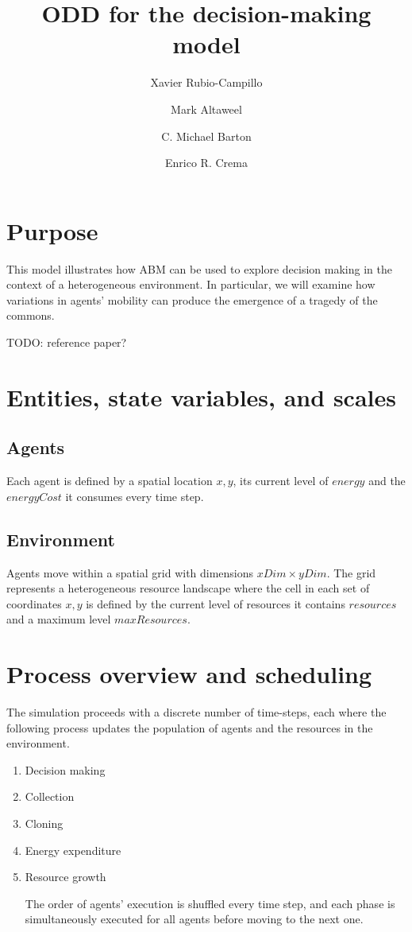 \documentclass[11pt,a4paper,twocolumn,notitlepage]{article}
\begin{document}
\title{ODD for the decision-making model}
\author{Xavier Rubio-Campillo \and Mark Altaweel \and C. Michael Barton \and Enrico R. Crema}
\maketitle

\section{Purpose}

This model illustrates how ABM can be used to explore decision making in the context of a heterogeneous environment. In particular, we will examine how variations in agents' mobility can produce the emergence of a tragedy of the commons.

TODO: reference paper?

\section{Entities, state variables, and scales}
\subsection{Agents}

Each agent is defined by a spatial location $x,y$, its current level of $energy$ and the $energyCost$ it consumes every time step.

\subsection{Environment}

Agents move within a spatial grid with dimensions $xDim \times yDim$. The grid represents a heterogeneous resource landscape where the cell in each set of coordinates $x,y$ is defined by the current level of resources it contains $resources$ and a maximum level $maxResources$. 

\section{Process overview and scheduling}

The simulation proceeds with a discrete number of time-steps, each where the following process updates the population of agents and the resources in the environment.

\begin{enumerate}
\item{Decision making}
\item{Collection}
\item{Cloning}
\item{Energy expenditure}
\item{Resource growth}

The order of agents' execution is shuffled every time step, and each phase is simultaneously executed for all agents before moving to the next one.

\end{enumerate}
\end{document}
